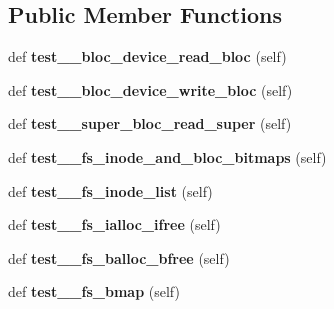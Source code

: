 \subsection*{Public Member Functions}
\begin{DoxyCompactItemize}
\item 
\hypertarget{classtester__server_1_1_minix_tester_ace7a146509eac31cfc0fc80de9403b08}{}def {\bfseries test\+\_\+\_\+bloc\+\_\+device\+\_\+read\+\_\+bloc} (self)\label{classtester__server_1_1_minix_tester_ace7a146509eac31cfc0fc80de9403b08}

\item 
\hypertarget{classtester__server_1_1_minix_tester_a24a380e585e1ee9c3305c238c83fb736}{}def {\bfseries test\+\_\+\_\+bloc\+\_\+device\+\_\+write\+\_\+bloc} (self)\label{classtester__server_1_1_minix_tester_a24a380e585e1ee9c3305c238c83fb736}

\item 
\hypertarget{classtester__server_1_1_minix_tester_ac80a8db66b10e26951f5b3dbb4ba6177}{}def {\bfseries test\+\_\+\_\+super\+\_\+bloc\+\_\+read\+\_\+super} (self)\label{classtester__server_1_1_minix_tester_ac80a8db66b10e26951f5b3dbb4ba6177}

\item 
\hypertarget{classtester__server_1_1_minix_tester_aea91283fb72bc66c47d112db5b9b0237}{}def {\bfseries test\+\_\+\_\+fs\+\_\+inode\+\_\+and\+\_\+bloc\+\_\+bitmaps} (self)\label{classtester__server_1_1_minix_tester_aea91283fb72bc66c47d112db5b9b0237}

\item 
\hypertarget{classtester__server_1_1_minix_tester_aa84f27bff9f41ed3507faee30ed19958}{}def {\bfseries test\+\_\+\_\+fs\+\_\+inode\+\_\+list} (self)\label{classtester__server_1_1_minix_tester_aa84f27bff9f41ed3507faee30ed19958}

\item 
\hypertarget{classtester__server_1_1_minix_tester_a486e61bd6413ac33f5d2589b1b5eff47}{}def {\bfseries test\+\_\+\_\+fs\+\_\+ialloc\+\_\+ifree} (self)\label{classtester__server_1_1_minix_tester_a486e61bd6413ac33f5d2589b1b5eff47}

\item 
\hypertarget{classtester__server_1_1_minix_tester_a138d86bcce3ab9464a9fae0397358b6d}{}def {\bfseries test\+\_\+\_\+fs\+\_\+balloc\+\_\+bfree} (self)\label{classtester__server_1_1_minix_tester_a138d86bcce3ab9464a9fae0397358b6d}

\item 
\hypertarget{classtester__server_1_1_minix_tester_a9f8509103647b8fec170dc9bd9995d3e}{}def {\bfseries test\+\_\+\_\+fs\+\_\+bmap} (self)\label{classtester__server_1_1_minix_tester_a9f8509103647b8fec170dc9bd9995d3e}


\end{DoxyCompactItemize}
